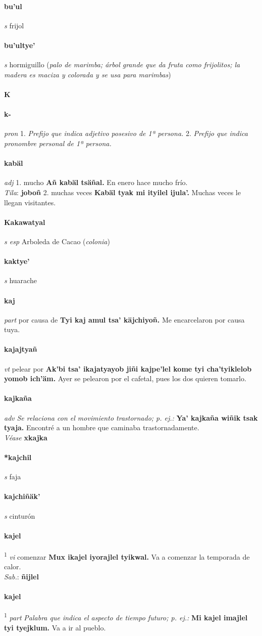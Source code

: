 \documentclass{scrbook}
\newcommand{\entry}[1]{\paragraph{#1}}
\newcommand{\alphaletter}[1]{\addsec{#1}}
\newcommand{\onedefinition}[1]{#1.}
\newcommand{\defsuperscript}[1]{\textsuperscript{1}}
\newcommand{\nontranslationdef}[1]{\textit{#1}}
\newcommand{\partofspeech}[1]{\textit{#1}}
\newcommand{\spanishtranslation}[1]{#1}
\newcommand{\clarification}[1]{(\textit{#1})}
\newcommand{\cholexample}[1]{\textbf{#1}}
\newcommand{\exampletranslation}[1]{#1}
\newcommand{\dialectvariant}[1]{\\\textit{#1}:}
\newcommand{\dialectword}[1]{\textbf{#1}}
\newcommand{\alsosee}[1]{\\\textit{Véase} \textbf{#1}}
\begin{document}
\begin{multicols}{2}
\entry{bu'ul}
\partofspeech{s}
\spanishtranslation{frijol}

\entry{bu'ultye'}
\partofspeech{s}
\spanishtranslation{hormiguillo}
\clarification{palo de marimba; árbol grande que da fruta como frijolitos; la madera es maciza y colorada y se usa para marimbas}

\entry{K}
\alphaletter{K}

\entry{k-}
\partofspeech{pron}
\onedefinition{1}
\nontranslationdef{Prefijo que indica adjetivo posesivo de 1ª persona.}
\onedefinition{2}
\nontranslationdef{Prefijo que indica pronombre personal de 1ª persona.}

\entry{kabäl}
\partofspeech{adj}
\onedefinition{1}
\spanishtranslation{mucho}
\cholexample{Añ kabäl tsäñal.}
\exampletranslation{En enero hace mucho frío.}
\dialectvariant{Tila}
\dialectword{joboñ}
\onedefinition{2}
\spanishtranslation{muchas veces}
\cholexample{Kabäl tyak mi ityilel ijula'.}
\exampletranslation{Muchas veces le llegan visitantes.}

\entry{Kakawatyal}
\partofspeech{s esp}
\spanishtranslation{Arboleda de Cacao}
\clarification{colonia}

\entry{kaktye'}
\partofspeech{s}
\spanishtranslation{huarache}

\entry{kaj}
\partofspeech{part}
\spanishtranslation{por causa de}
\cholexample{Tyi kaj amul tsa' käjchiyoñ.}
\exampletranslation{Me encarcelaron por causa tuya.}

\entry{kajajtyañ}
\partofspeech{vt}
\spanishtranslation{pelear por}
\cholexample{Ak'bi tsa' ikajatyayob jiñi kajpe'lel kome tyi cha'tyiklelob yomob ich'äm.}
\exampletranslation{Ayer se pelearon por el cafetal, pues los dos quieren tomarlo.}

\entry{kajkaña}
\partofspeech{adv}
\nontranslationdef{Se relaciona con el movimiento trastornado; p. ej.:}
\cholexample{Ya' kajkaña wiñik tsak tyaja.}
\exampletranslation{Encontré a un hombre que caminaba trastornadamente.}
\alsosee{xkajka}

\entry{*kajchil}
\partofspeech{s}
\spanishtranslation{faja}

\entry{kajchiñäk'}
\partofspeech{s}
\spanishtranslation{cinturón}

\entry{kajel}
\defsuperscript{1}
\partofspeech{vi}
\spanishtranslation{comenzar}
\cholexample{Mux ikajel iyorajlel tyikwal.}
\exampletranslation{Va a comenzar la temporada de calor.}
\dialectvariant{Sab.}
\dialectword{ñijlel}

\entry{kajel}
\defsuperscript{2}
\partofspeech{part}
\nontranslationdef{Palabra que indica el aspecto de tiempo futuro; p. ej.:}
\cholexample{Mi kajel imajlel tyi tyejklum.}
\exampletranslation{Va a ir al pueblo.}


\end{multicols}
\end{document}
